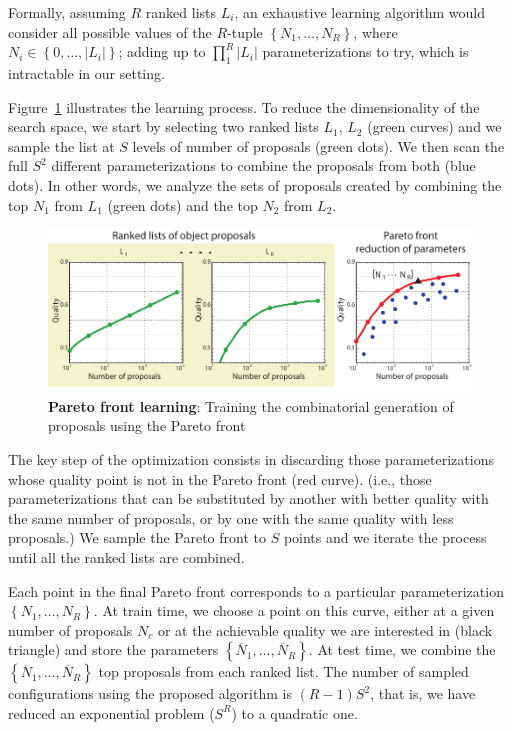 \documentclass[10pt,journal,cspaper,compsoc]{IEEEtran}
\begin{document}
Formally, assuming $R$ ranked lists $L_i$, an exhaustive learning algorithm would consider
all possible values of the $R$-tuple $\left\{N_1,\dots,N_R\right\}$, where $N_i\in\left\{0,\dots,|L_i|\right\}$;
adding up to $\prod_1^R \left|L_i\right|$ parameterizations to try,
which is intractable in our setting.

Figure~\ref{fig:pareto} illustrates the learning process.
To reduce the dimensionality of the search space, we start by selecting two ranked lists $L_1$, $L_2$ (green curves)
and we sample the list at $S$ levels of number of proposals (green dots).
We then scan the full $S^2$ different parameterizations to combine the proposals from both (blue dots).
In other words, we analyze the sets of proposals created by combining the top $N_1$ from $L_1$ (green dots) and
the top $N_2$ from $L_2$.

\begin{figure}[h!]
   \includegraphics[width=\linewidth]{figures/pareto.pdf}
   \caption{\textbf{Pareto front learning}:
   Training the combinatorial generation of proposals using the Pareto front}
   \label{fig:pareto}
\end{figure}

The key step of the optimization consists in discarding those parameterizations whose quality point is not
in the Pareto front (red curve).
(i.e., those parameterizations that can be substituted by another with better quality
with the same number of proposals, or by one with the same quality with less proposals.)
We sample the Pareto front to $S$ points and we iterate the process until all the ranked lists are combined.

Each point in the final Pareto front corresponds to a particular parameterization $\left\{N_1,\dots,N_R\right\}$.
At train time, we choose a point on this curve, either at a given number of proposals $N_c$ or at the achievable
quality we are interested in (black triangle) and store the parameters $\left\{\overline{N}_1,\dots,\overline{N}_R\right\}$.
At test time, we combine the $\left\{\overline{N}_1,\dots,\overline{N}_R\right\}$ top proposals from each ranked list.
The number of sampled configurations using the proposed algorithm is $(R\!-\!1)S^2$, that is, we have reduced an
exponential problem ($S^R$) to a quadratic one.
\end{document}

